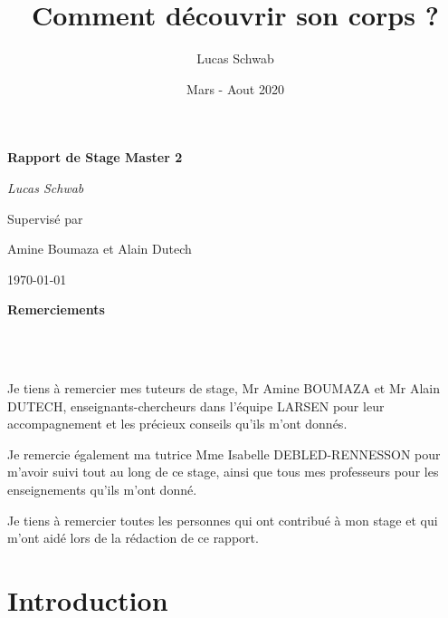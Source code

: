 \documentclass[11pt,french]{report}
\title{Comment découvrir son corps ?}
\author{Lucas Schwab}
\date{Mars - Aout 2020}
\begin{document}

\begin{titlepage}
   \centering
   \vspace*{0.3\textheight}
	
	{\huge\bfseries Rapport de Stage Master 2\par}
	\vspace{2cm}
	{\Large\itshape Lucas Schwab\par}
	\vspace{1,5cm}
	
	Supervisé par\par
	Amine Boumaza et Alain Dutech

	\vfill

	{\large \today\par}
\end{titlepage}


\noindent\textbf{\Huge Remerciements}

\phantom{INVISIBLE LINE}\\
\phantom{INVISIBLE LINE}\\
\phantom{INVISIBLE LINE}

Je tiens à remercier mes tuteurs de stage, Mr Amine BOUMAZA et Mr Alain DUTECH, enseignants-chercheurs dans l'équipe LARSEN pour leur accompagnement et les précieux conseils qu'ils m'ont donnés.

Je remercie également ma tutrice Mme Isabelle DEBLED-RENNESSON pour m'avoir suivi tout au long de ce stage, ainsi que tous mes professeurs pour les enseignements qu'ils m'ont donné.

Je tiens à remercier toutes les personnes qui ont contribué à mon stage et qui m'ont aidé lors de la rédaction de ce rapport.

\tableofcontents


\chapter{Introduction}
\end{document}
